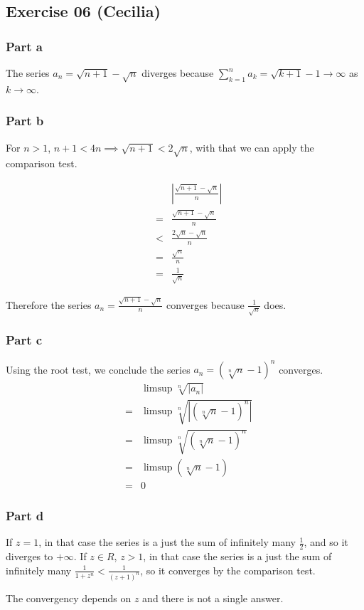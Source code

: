 \subsection*{Exercise 06 (Cecilia)}
\subsubsection*{Part a}
The series $ a_n = \sqrt{n + 1} - \sqrt{n} $ diverges because $ \sum\limits_{k=1}^{n} a_k = \sqrt{k + 1} - 1 \to \infty $ as $ k \to \infty $.

\subsubsection*{Part b}
For $ n > 1 $, $ n + 1 < 4n \implies \sqrt{n + 1} < 2\sqrt{n} $, with that we can apply the comparison test.

\begin{eqnarray*}
  & & \left|\frac{\sqrt{n+1} - \sqrt{n}}{n} \right| \\
  &=& \frac{\sqrt{n+1} - \sqrt{n}}{n} \\
  &<& \frac{2\sqrt{n} - \sqrt{n}}{n} \\
  &=& \frac{\sqrt{n}}{n} \\
  &=& \frac{1}{\sqrt{n}}
\end{eqnarray*}

Therefore the series $ a_n = \frac{\sqrt{n + 1} - \sqrt{n}}{n} $ converges because $ \frac{1}{\sqrt{n}} $ does.

\subsubsection*{Part c}

Using the root test, we conclude the series $ a_n = (\sqrt[n]{n}-1)^n $ converges.
\begin{eqnarray*}
    & & \limsup \sqrt[n]{|a_n|} \\
    &=& \limsup \sqrt[n]{|(\sqrt[n]{n}-1)^n|} \\
    &=& \limsup \sqrt[n]{(\sqrt[n]{n}-1)^n} \\
    &=& \limsup (\sqrt[n]{n}-1) \\
    &=& 0
\end{eqnarray*}

\subsubsection*{Part d}
If $ z = 1 $, in that case the series is a just the sum of infinitely many $ \frac{1}{2} $, and so it diverges to $ + \infty $.
If $ z \in R $, $ z > 1 $, in that case the series is a just the sum of infinitely many $ \frac{1}{1 + z^n} < \frac{1}{(z+1)^n} $, so it converges by the comparison test.

The convergency depends on $ z $ and there is not a single answer.
